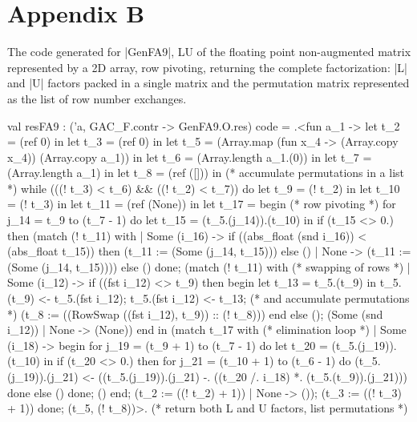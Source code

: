 \documentclass[draft]{elsart}
\begin{document}
\section{Appendix B}
The code generated for |GenFA9|, LU of the floating point
non-augmented matrix
represented by a 2D array, row pivoting, returning the complete
factorization: |L| and |U|
factors packed in a single matrix and the permutation matrix
represented as the list of row number exchanges.
\begin{code2}
val resFA9 : ('a, GAC_F.contr -> GenFA9.O.res) code =
  .<fun a_1 ->
   let t_2 = (ref 0) in
   let t_3 = (ref 0) in
   let t_5 = (Array.map (fun x_4 -> (Array.copy x_4)) (Array.copy a_1)) in
   let t_6 = (Array.length a_1.(0)) in
   let t_7 = (Array.length a_1) in
   let t_8 = (ref ([])) in  (* accumulate permutations in a list *)
   while (((! t_3) < t_6) && ((! t_2) < t_7)) do
    let t_9 = (! t_2) in
    let t_10 = (! t_3) in
    let t_11 = (ref (None)) in
    let t_17 =
     begin   (* row pivoting *)
      for j_14 = t_9 to (t_7 - 1) do
       let t_15 = (t_5.(j_14)).(t_10) in
       if (t_15 <> 0.) then
        (match (! t_11) with
         | Some (i_16) ->
            if ((abs_float (snd i_16)) < (abs_float t_15)) then
             (t_11 := (Some (j_14, t_15)))
            else ()
         | None -> (t_11 := (Some (j_14, t_15))))
       else ()
      done;
      (match (! t_11) with  (* swapping of rows *)
       | Some (i_12) ->
          if ((fst i_12) <> t_9) then begin
           let t_13 = t_5.(t_9) in
           t_5.(t_9) <- t_5.(fst i_12);
           t_5.(fst i_12) <- t_13;  (* and accumulate permutations *)
           (t_8 := ((RowSwap ((fst i_12), t_9)) :: (! t_8)))
          end else ();
          (Some (snd i_12))
       | None -> (None))
     end in
    (match t_17 with  (* elimination loop *)
     | Some (i_18) ->
        begin
         for j_19 = (t_9 + 1) to (t_7 - 1) do
          let t_20 = (t_5.(j_19)).(t_10) in
          if (t_20 <> 0.) then
           for j_21 = (t_10 + 1) to (t_6 - 1) do
            (t_5.(j_19)).(j_21) <-
             ((t_5.(j_19)).(j_21) -. ((t_20 /. i_18) *. (t_5.(t_9)).(j_21)))
           done
          else ()
         done;
         ()
        end;
        (t_2 := ((! t_2) + 1))
     | None -> ());
    (t_3 := ((! t_3) + 1))
   done;
   (t_5, (! t_8))>. (* return both L and U factors, list permutations *)
\end{code2}
\end{document}
